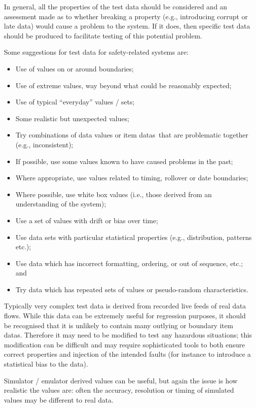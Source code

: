 In general, all the properties of the test data should be considered and an assessment made as to whether breaking a property (e.g., introducing corrupt or late data) would cause a problem to the system. If it does, then specific test data should be produced to facilitate testing of this potential problem.

Some suggestions for test data for safety-related systems are:
\begin{itemize}
  \item Use of values on or around boundaries;
  \item Use of extreme values, way beyond what could be reasonably expected;
  \item Use of typical ``everyday'' values / sets;
  \item Some realistic but unexpected values;
  \item Try combinations of data values or \cbstart\glspl{item data}\cbend\ that are problematic together (e.g., inconsistent);
  \item If possible, use some values known to have caused problems in the past;
  \item Where appropriate, use values related to timing, rollover or date boundaries;
  \item Where possible, use white box values (i.e., those derived from an understanding of the system);
  \item Use a set of values with drift or bias over time;
  \item Use data sets with particular statistical properties (e.g., distribution, patterns etc.);
  \item Use data which has incorrect formatting, ordering, or out of sequence, etc.; and
  \item Try data which has repeated sets of values or pseudo-random characteristics.
\end{itemize}
Typically very complex test data is derived from recorded live feeds of real data flows. While this data can be extremely useful for regression purposes, it should be recognised that it is unlikely to contain many outlying or boundary \glspl{item data}. Therefore it may need to be modified to test any hazardous situations; this modification can be difficult and may require sophisticated tools to both ensure correct properties and injection of the intended faults (for instance to introduce a statistical bias to the data).

Simulator / emulator derived values can be useful, but again the issue is how realistic the values are: often the \gls{accuracy}, resolution or timing of simulated values may be different to real data.

